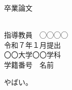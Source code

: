 \documentclass[uplatex,dvipdfmx,a4paper,12pt,12ptj]{jsreport}
\begin{document}
\thispagestyle{empty}
\begin{center}

\vspace{20mm}
{\huge\noindent 卒業論文}\\
\vspace{20mm}
{\huge{}}\\
\medskip
\vspace{20mm}

{\Large\noindent
指導教員　◯◯◯◯    \\
\vspace{\baselineskip}
\vspace{30mm}
{令和７年１月提出}\\
\vspace{20mm}
\hfill 〇〇大学〇〇学科 \\
\hfill 学籍番号　名前\\
}
\vspace{40mm}

\end{center}


\tableofcontents



\cite{yaoChargeTransferEffects2018}やばい。




\end{document}
